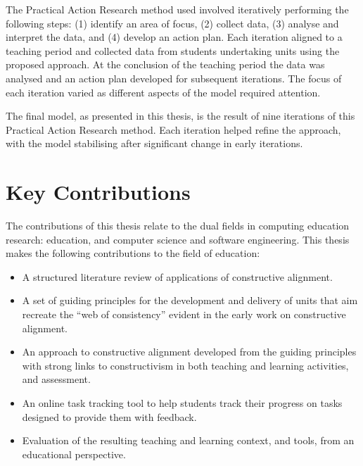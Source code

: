 The Practical Action Research method used involved iteratively performing the following steps: (1) identify an area of focus, (2) collect data, (3) analyse and interpret the data, and (4) develop an action plan. Each iteration aligned to a teaching period and collected data from students undertaking units using the proposed approach. At the conclusion of the teaching period the data was analysed and an action plan developed for subsequent iterations. The focus of each iteration varied as different aspects of the model required attention.

The final model, as presented in this thesis, is the result of nine iterations of this Practical Action Research method. Each iteration helped refine the approach, with the model stabilising after significant change in early iterations. 


\section{Key Contributions} %
\label{sec:key_contributions}

The contributions of this thesis relate to the dual fields in computing education research: education, and computer science and software engineering. This thesis makes the following contributions to the field of education:
\begin{itemize}[noitemsep,nolistsep]
	\item A structured literature review of applications of constructive alignment.
	\item A set of guiding principles for the development and delivery of units that aim recreate the ``web of consistency'' evident in the early work on constructive alignment. 
	\item An approach to constructive alignment developed from the guiding principles with strong links to constructivism in both teaching and learning activities, and assessment.
	\item An online task tracking tool to help students track their progress on tasks designed to provide them with feedback.
	\item Evaluation of the resulting teaching and learning context, and tools, from an educational perspective.
\end{itemize}

